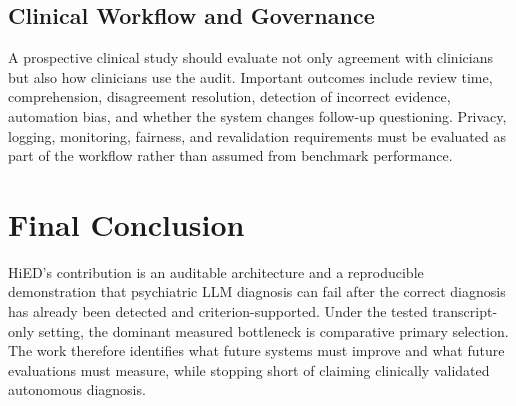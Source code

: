 \subsection{Clinical Workflow and Governance}

A prospective clinical study should evaluate not only agreement with clinicians but also how clinicians use the audit. Important outcomes include review time, comprehension, disagreement resolution, detection of incorrect evidence, automation bias, and whether the system changes follow-up questioning. Privacy, logging, monitoring, fairness, and revalidation requirements must be evaluated as part of the workflow rather than assumed from benchmark performance.

\section{Final Conclusion}

HiED's contribution is an auditable architecture and a reproducible demonstration that psychiatric LLM diagnosis can fail after the correct diagnosis has already been detected and criterion-supported. Under the tested transcript-only setting, the dominant measured bottleneck is comparative primary selection. The work therefore identifies what future systems must improve and what future evaluations must measure, while stopping short of claiming clinically validated autonomous diagnosis.
